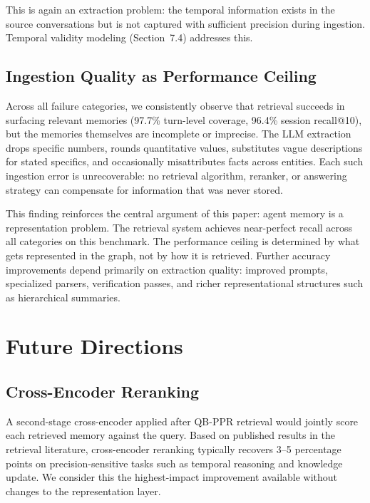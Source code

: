 \documentclass[11pt,a4paper]{article}
\begin{document}
This is again an extraction problem: the temporal information exists in the source conversations but is not captured with sufficient precision during ingestion. Temporal validity modeling (Section~7.4) addresses this.

\subsection{Ingestion Quality as Performance Ceiling}

Across all failure categories, we consistently observe that retrieval succeeds in surfacing relevant memories (97.7\% turn-level coverage, 96.4\% session recall@10), but the memories themselves are incomplete or imprecise. The LLM extraction drops specific numbers, rounds quantitative values, substitutes vague descriptions for stated specifics, and occasionally misattributes facts across entities. Each such ingestion error is unrecoverable: no retrieval algorithm, reranker, or answering strategy can compensate for information that was never stored.

This finding reinforces the central argument of this paper: agent memory is a representation problem. The retrieval system achieves near-perfect recall across all categories on this benchmark. The performance ceiling is determined by what gets represented in the graph, not by how it is retrieved. Further accuracy improvements depend primarily on extraction quality: improved prompts, specialized parsers, verification passes, and richer representational structures such as hierarchical summaries.

\section{Future Directions}

\subsection{Cross-Encoder Reranking}

A second-stage cross-encoder applied after QB-PPR retrieval would jointly score each retrieved memory against the query. Based on published results in the retrieval literature, cross-encoder reranking typically recovers 3--5 percentage points on precision-sensitive tasks such as temporal reasoning and knowledge update. We consider this the highest-impact improvement available without changes to the representation layer.
\end{document}
